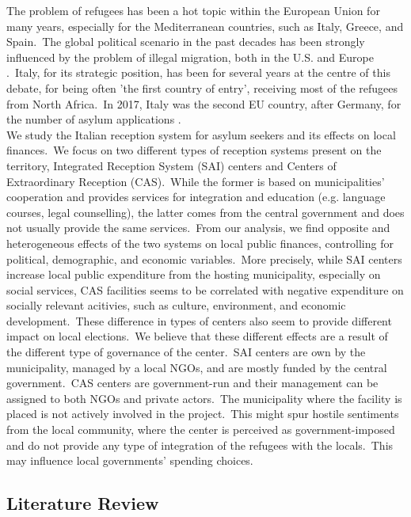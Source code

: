\documentclass[authoryear,preprint,review,12pt]{elsarticle}
\begin{document}
\noindent
The problem of refugees has been a hot topic within the European Union for many years, especially for the Mediterranean countries, such as Italy, Greece, and Spain.\ The global political scenario in the past decades has been strongly influenced by the problem of illegal migration, both in the U.S. and Europe \citep{bracco2018}.\ Italy, for its strategic position, has been for several years at the centre of this debate, for being often 'the first country of entry', receiving most of the refugees from North Africa.\ In 2017, Italy was the second EU country, after Germany, for the number of asylum applications \citep{campesi2018}.\\

\noindent
We study the Italian reception system for asylum seekers and its effects on local finances.\ We focus on two different types of reception systems present on the territory, Integrated Reception System (SAI) centers and Centers of Extraordinary Reception (CAS).\ While the former is based on municipalities' cooperation and provides services for integration and education (e.g. language courses, legal counselling), the latter comes from the central government and does not usually provide the same services.\ From our analysis, we find opposite and heterogeneous effects of the two systems on local public finances, controlling for political, demographic, and economic variables.\ More precisely, while SAI centers increase local public expenditure from the hosting municipality, especially on social services, CAS facilities seems to be correlated with negative expenditure on socially relevant acitivies, such as culture, environment, and economic development.\ These difference in types of centers also seem to provide different impact on local elections.\ We believe that these different effects are a result of the different type of governance of the center.\ SAI centers are own by the municipality, managed by a local NGOs, and are mostly funded by the central government.\ CAS centers are government-run and their management can be assigned to both NGOs and private actors.\ The municipality where the facility is placed is not actively involved in the project.\ This might spur hostile sentiments from the local community, where the center is perceived as government-imposed and do not provide any type of integration of the refugees with the locals.\ This may influence local governments' spending choices.\\ 

\subsection*{Literature Review}
\end{document}
